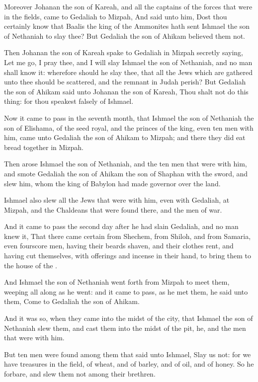 \Verse Moreover Johanan the son of Kareah, and all the captains of the forces that were in the fields, came to Gedaliah to Mizpah, \Verse And said unto him, Dost thou certainly know that Baalis the king of the Ammonites hath sent Ishmael the son of Nethaniah to slay thee? But Gedaliah the son of Ahikam believed them not.

\Verse Then Johanan the son of Kareah spake to Gedaliah in Mizpah secretly saying, Let me go, I pray thee, and I will slay Ishmael the son of Nethaniah, and no man shall know it: wherefore should he slay thee, that all the Jews which are gathered unto thee should be scattered, and the remnant in Judah perish?  \Verse But Gedaliah the son of Ahikam said unto Johanan the son of Kareah, Thou shalt not do this thing: for thou speakest falsely of Ishmael.


\Chapter
\Verse Now it came to pass in the seventh month, that Ishmael the son of Nethaniah the son of Elishama, of the seed royal, and the princes of the king, even ten men with him, came unto Gedaliah the son of Ahikam to Mizpah; and there they did eat bread together in Mizpah.

\Verse Then arose Ishmael the son of Nethaniah, and the ten men that were with him, and smote Gedaliah the son of Ahikam the son of Shaphan with the sword, and slew him, whom the king of Babylon had made governor over the land.

\Verse Ishmael also slew all the Jews that were with him, even with Gedaliah, at Mizpah, and the Chaldeans that were found there, and the men of war.

\Verse And it came to pass the second day after he had slain Gedaliah, and no man knew it, \Verse That there came certain from Shechem, from Shiloh, and from Samaria, even fourscore men, having their beards shaven, and their clothes rent, and having cut themselves, with offerings and incense in their hand, to bring them to the house of the \LORD.

\Verse And Ishmael the son of Nethaniah went forth from Mizpah to meet them, weeping all along as he went: and it came to pass, as he met them, he said unto them, Come to Gedaliah the son of Ahikam.

\Verse And it was so, when they came into the midst of the city, that Ishmael the son of Nethaniah slew them, and cast them into the midst of the pit, he, and the men that were with him.

\Verse But ten men were found among them that said unto Ishmael, Slay us not: for we have treasures in the field, of wheat, and of barley, and of oil, and of honey. So he forbare, and slew them not among their brethren.


